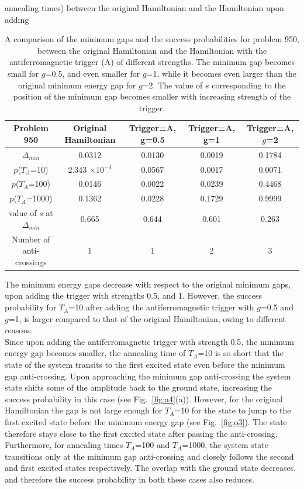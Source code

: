 \documentclass[../main.tex]{subfiles}
\begin{document}
\begin{table}[H]
\centering
\renewcommand{\arraystretch}{1.5} annealing times) between the original Hamiltonian and the Hamiltonian upon adding
\begin{tabular}{|c|c|c|c|c|}
\hline 
Problem 950 & Original Hamiltonian & Trigger=A, g=0.5 & Trigger=A, g=1 & Trigger=A, $g$=2 \\ 
\hline 
$\Delta_{min}$ & 0.0312 & 0.0130 & 0.0019 & 0.1784 \\ 
\hline 
$p$($T_A$=10) & 2.343 $\times 10^{-4}$ & 0.0567 & 0.0017 & 0.0071\\ 
\hline 
$p$($T_A$=100) & 0.0146 & 0.0022 & 0.0239 & 0.4468 \\ 
\hline 
$p$($T_A$=1000) & 0.1362 & 0.0228 & 0.1729 & 0.9999 \\ 
\hline 
value of $s$ at $\Delta_{min}$ & 0.665 & 0.644 & 0.601 & 0.263 \\ 
\hline 
Number of anti-crossings & 1 & 1 & 2 & 3 \\
\hline
\end{tabular} 
\caption{A comparison of the minimum gaps and the success probabilities for problem 950, between the original Hamiltonian and the Hamiltonian with the antiferromagnetic trigger (A) of different strengths. The minimum gap becomes small for $g$=0.5, and even smaller for $g$=1, while it becomes even larger than the original minimum energy gap for $g$=2. The value of $s$ corresponding to the position of the minimum gap becomes smaller with increasing strength of the trigger.}
\label{tab:a2}
\end{table}


The minimum energy gaps decrease with respect to the original minimum gaps, upon adding the trigger with strengths 0.5, and 1. However, the success probability for $T_A$=10 after adding the antiferromagnetic trigger with $g$=0.5 and $g$=1, is larger compared to that of the original Hamiltonian, owing to different reasons.\\

Since upon adding the antiferromagnetic trigger with strength 0.5, the minimum energy gap becomes smaller, the annealing time of $T_A$=10 is so short that the state of the system transits to the first excited state even before the minimum gap anti-crossing. Upon approaching the minimum gap anti-crossing the system state shifts some of the amplitude back to the ground state, increasing the success probability in this case (see Fig.~\ref{fig:a4}(a)). However, for the original Hamiltonian the gap is not large enough for $T_A$=10 for the state to jump to the first excited state before the minimum energy gap (see Fig.~\ref{fig:o3}). The state therefore stays close to the first excited state after passing the anti-crossing.\\
Furthermore, for annealing times $T_A$=100 and $T_A$=1000, the system state transitions only at the minimum gap anti-crossing and closely follows the second and first excited states respectively. The overlap with the ground state decreases, and therefore the success probability in both these cases also reduces.\\
\end{document}
